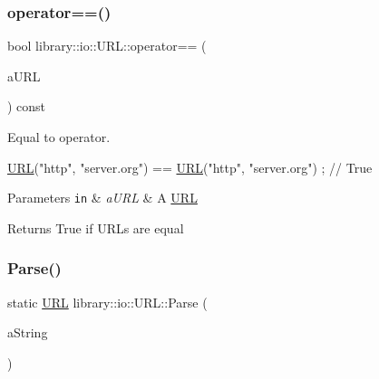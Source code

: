 \subsubsection{\texorpdfstring{operator==()}{operator==()}}
{\footnotesize\ttfamily bool library\+::io\+::\+U\+R\+L\+::operator== (\begin{DoxyParamCaption}\item[{const \hyperlink{classlibrary_1_1io_1_1_u_r_l}{U\+RL} \&}]{a\+U\+RL }\end{DoxyParamCaption}) const}



Equal to operator. 


\begin{DoxyCode}
\hyperlink{classlibrary_1_1io_1_1_u_r_l_a7e9c070138a6dbd000ffb10b7cd8a5c4}{URL}(\textcolor{stringliteral}{"http"}, \textcolor{stringliteral}{"server.org"}) == \hyperlink{classlibrary_1_1io_1_1_u_r_l_a7e9c070138a6dbd000ffb10b7cd8a5c4}{URL}(\textcolor{stringliteral}{"http"}, \textcolor{stringliteral}{"server.org"}) ; \textcolor{comment}{// True}
\end{DoxyCode}



\begin{DoxyParams}[1]{Parameters}
\mbox{\tt in}  & {\em a\+U\+RL} & A \hyperlink{classlibrary_1_1io_1_1_u_r_l}{U\+RL} \\
\hline
\end{DoxyParams}
\begin{DoxyReturn}{Returns}
True if U\+R\+Ls are equal 
\end{DoxyReturn}
\mbox{\label{classlibrary_1_1io_1_1_u_r_l_a98cf42141cf75e1dd5362eb208a1e2bd}} 
\subsubsection{\texorpdfstring{Parse()}{Parse()}}
{\footnotesize\ttfamily static \hyperlink{classlibrary_1_1io_1_1_u_r_l}{U\+RL} library\+::io\+::\+U\+R\+L\+::\+Parse (\begin{DoxyParamCaption}\item[{const \hyperlink{namespacelibrary_1_1io_a7469b45835a4421045db344d6a5a1f85}{String} \&}]{a\+String }\end{DoxyParamCaption})\hspace{0.3cm}{\ttfamily [static]}}



